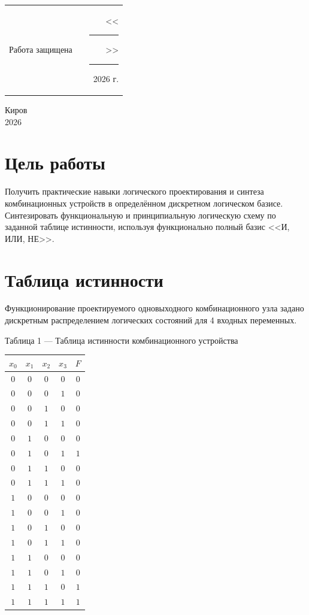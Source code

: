 \documentclass[oneside,a4paper,14pt]{extarticle}
\begin{document}
\noindent
\begin{tabular}{lp{58mm}r}
  Работа защищена &  & \hspace{5mm}<<\rule[-1mm]{5mm}{0.10mm}\/>>\rule[-1mm]{30mm}{0.10mm}\ 2026 г.
\end{tabular}
\vfill

\begin{center}
  Киров\\
  2026
\end{center}

\newpage\thispagestyle{plain}

\section{Цель работы}
Получить практические навыки логического проектирования и синтеза комбинационных устройств в определённом дискретном логическом базисе. Синтезировать функциональную и принципиальную логическую схему по заданной таблице истинности, используя функционально полный базис <<И, ИЛИ, НЕ>>.

\section{Таблица истинности}
Функционирование проектируемого одновыходного комбинационного узла задано дискретным распределением логических состояний для 4 входных переменных.

\begin{center}
  Таблица 1 --- Таблица истинности комбинационного устройства \\
  \vspace{5mm}
  \begin{tabular}{cccc|c}
    $x_0$ & $x_1$ & $x_2$ & $x_3$ & $F$ \\
    \hline
    $0$   & $0$   & $0$   & $0$   & $0$ \\
    $0$   & $0$   & $0$   & $1$   & $0$ \\
    $0$   & $0$   & $1$   & $0$   & $0$ \\
    $0$   & $0$   & $1$   & $1$   & $0$ \\
    $0$   & $1$   & $0$   & $0$   & $0$ \\
    $0$   & $1$   & $0$   & $1$   & $1$ \\
    $0$   & $1$   & $1$   & $0$   & $0$ \\
    $0$   & $1$   & $1$   & $1$   & $0$ \\
    $1$   & $0$   & $0$   & $0$   & $0$ \\
    $1$   & $0$   & $0$   & $1$   & $0$ \\
    $1$   & $0$   & $1$   & $0$   & $0$ \\
    $1$   & $0$   & $1$   & $1$   & $0$ \\
    $1$   & $1$   & $0$   & $0$   & $0$ \\
    $1$   & $1$   & $0$   & $1$   & $0$ \\
    $1$   & $1$   & $1$   & $0$   & $1$ \\
    $1$   & $1$   & $1$   & $1$   & $1$ \\
  \end{tabular}
\end{center}
\end{document}
